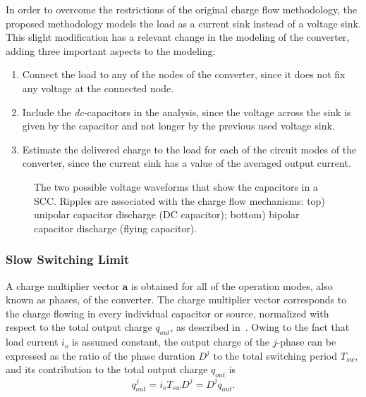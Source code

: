 In order to overcome the restrictions of the original charge flow methodology, the proposed methodology models the load as a current sink instead of a voltage sink. This slight modification has a relevant change in the modeling of the converter, adding three important aspects to the modeling:
\begin{enumerate}
  \item Connect the load to any of the nodes of the converter, since it does not fix any voltage at the connected node.

  \item Include the \emph{dc}-capacitors in the analysis, since the voltage across the sink is given by the capacitor and not longer by the previous used voltage sink.

  \item Estimate the delivered charge to the load for each of the circuit modes of the converter, since the current sink has a value of the averaged output current.
\end{enumerate}

\begin{figure}[!h]
\centering

\caption{The two possible voltage waveforms that show the capacitors in a SCC. Ripples are associated with the charge flow mechanisms: top) unipolar capacitor discharge (DC capacitor); bottom) bipolar capacitor discharge (flying capacitor).}
\label{fig:cap_riples}
\end{figure}


\subsubsection[SSL]{Slow Switching Limit}

A charge multiplier vector $\mathbf{a}$ is obtained for all of the operation modes, also known as phases, of the converter. The charge multiplier vector corresponds to the charge flowing in every individual capacitor or source, normalized with respect to the total output charge $q_{out}$, as described in~\cite{95Makowski,Seeman:EECS-2009-78}. Owing to the fact that load current $i_o$ is assumed constant, the output charge of the $j$-phase can be expressed as the ratio of the phase duration $D^j$ to the total switching period $T_{sw}$, and its contribution to the total output charge $q_{out}$ is
\begin{equation}
    q^j_{out} = i_{o} T_{sw} D^j = D^j q_{out} .
\label{eq:qout}
\end{equation}

